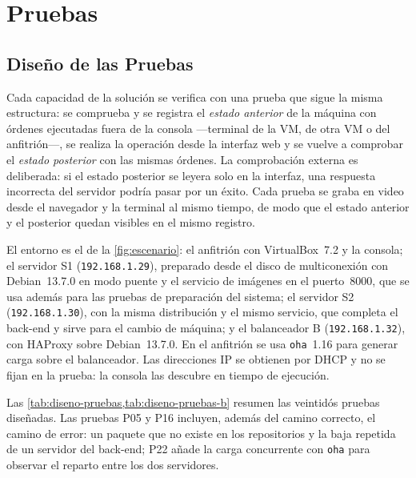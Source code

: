 \section{Pruebas}
\label{sec:pruebas}

\subsection{Diseño de las Pruebas}
\label{sec:diseno-pruebas}

Cada capacidad de la solución se verifica con una prueba que sigue la
misma estructura: se comprueba y se registra el \emph{estado anterior}
de la máquina con órdenes ejecutadas fuera de la consola ---terminal de
la VM, de otra VM o del anfitrión---, se realiza la operación desde la
interfaz web y se vuelve a comprobar el \emph{estado posterior} con las
mismas órdenes. La comprobación externa es deliberada: si el estado
posterior se leyera solo en la interfaz, una respuesta incorrecta del
servidor podría pasar por un éxito. Cada prueba se graba en video desde
el navegador y la terminal al mismo tiempo, de modo que el estado
anterior y el posterior quedan visibles en el mismo registro.

El entorno es el de la \cref{fig:escenario}: el anfitrión con
VirtualBox~7.2 y la consola; el servidor S1 (\texttt{192.168.1.29}),
preparado desde el disco de multiconexión con Debian~13.7.0 en modo
puente y el servicio de imágenes en el puerto~8000, que se usa además
para las pruebas de preparación del sistema; el servidor S2
(\texttt{192.168.1.30}), con la misma distribución y el mismo servicio,
que completa el back-end y sirve para el cambio de máquina; y el
balanceador B (\texttt{192.168.1.32}), con HAProxy sobre Debian~13.7.0.
En el anfitrión se usa \texttt{oha}~1.16 para generar carga sobre el
balanceador. Las direcciones IP se obtienen por DHCP y no se fijan en la
prueba: la consola las descubre en tiempo de ejecución.

Las \cref{tab:diseno-pruebas,tab:diseno-pruebas-b}
resumen las veintidós pruebas diseñadas. Las pruebas P05 y P16 incluyen, además
del camino correcto, el camino de error: un paquete que no existe en los
repositorios y la baja repetida de un servidor del back-end; P22 añade la
carga concurrente con \texttt{oha} para observar el reparto entre los dos
servidores.


